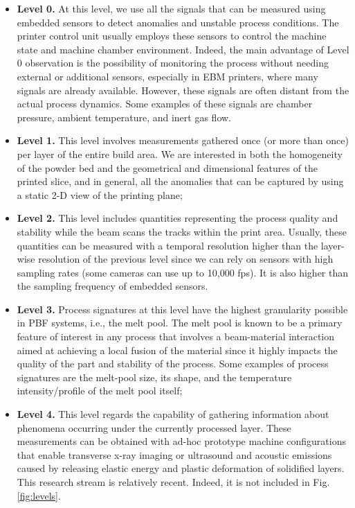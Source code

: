 \begin{itemize}
    \item \textbf{Level 0.} At this level, we use all the signals that can be measured using embedded sensors to detect anomalies and unstable process conditions. The printer control unit usually employs these sensors to control the machine state and machine chamber environment. Indeed, the main advantage of Level 0 observation is the possibility of monitoring the process without needing external or additional sensors, especially in EBM printers, where many signals are already available. However, these signals are often distant from the actual process dynamics. Some examples of these signals are chamber pressure, ambient temperature, and inert gas flow.
    \item \textbf{Level 1.} This level involves measurements gathered once (or more than once) per layer of the entire build area. We are interested in both the homogeneity of the powder bed and the geometrical and dimensional features of the printed slice, and in general, all the anomalies that can be captured by using a static 2-D view of the printing plane;
    \item \textbf{Level 2.} This level includes quantities representing the process quality and stability while the beam scans the tracks within the print area. Usually, these quantities can be measured with a temporal resolution higher than the layer-wise resolution of the previous level since we can rely on sensors with high sampling rates (some cameras can use up to 10,000 fps). It is also higher than the sampling frequency of embedded sensors.
    \item \textbf{Level 3.} Process signatures at this level have the highest granularity possible in PBF systems, i.e., the melt pool. The melt pool is known to be a primary feature of interest in any process that involves a beam-material interaction aimed at achieving a local fusion of the material since it highly impacts the quality of the part and stability of the process. Some examples of process signatures are the melt-pool size, its shape, and the temperature intensity/profile of the melt pool itself;
    \item \textbf{Level 4.} This level regards the capability of gathering information about phenomena occurring under the currently processed layer. These measurements can be obtained with ad-hoc prototype machine configurations that enable transverse x-ray imaging or ultrasound and acoustic emissions caused by releasing elastic energy and plastic deformation of solidified layers. This research stream is relatively recent. Indeed, it is not included in Fig. \ref{fig:levels}.
\end{itemize}



